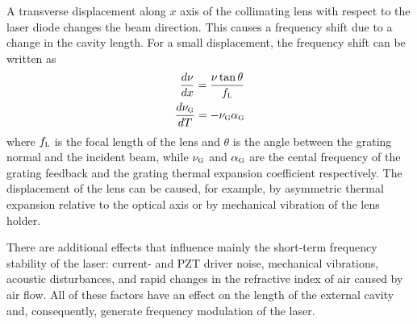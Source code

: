 A transverse displacement along $x$ axis of the collimating lens with respect to the laser diode changes the beam direction. This causes a frequency shift due to a change in the cavity length. For a small displacement, the frequency shift can be written as
\begin{align}
\frac{d\nu}{dx}=\frac{\nu\tan\theta}{f_{\mbox{\footnotesize{\scshape{l}}}}}
\label{displacement}\\
\frac{d\nu_{\mbox{\footnotesize{\scshape{g}}}}}{dT}=-\nu_{\mbox{\footnotesize{\scshape{g}}}}\alpha_{\mbox{\footnotesize{\scshape{g}}}}
\label{displacement2}
\end{align}
where $f_{\mbox{\footnotesize{\scshape{l}}}}$ is the focal length of the lens and $\theta$ is the angle between the grating normal and the incident beam, while $\nu_{\mbox{\footnotesize{\scshape{g}}}}$ and $\alpha_{\mbox{\footnotesize{\scshape{g}}}}$ are the cental frequency of the grating feedback and the grating thermal expansion coefficient respectively. The displacement of the lens can be caused, for example, by asymmetric thermal expansion relative to the optical axis or by mechanical vibration of the lens holder. 

There are additional effects that influence mainly the short-term frequency stability of the laser: current- and PZT driver noise, mechanical vibrations, acoustic disturbances, and rapid changes in the refractive index of air caused by air flow. All of these factors have an effect on the length of the external cavity and, consequently, generate frequency modulation of the laser.








